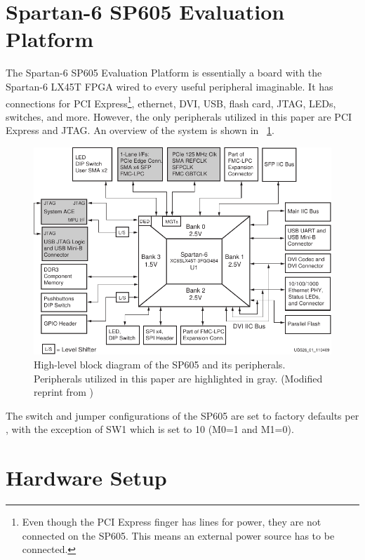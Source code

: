 \TODO

\section{Spartan-6 SP605 Evaluation Platform}

The Spartan-6 SP605 Evaluation Platform is essentially a board with the Spartan-6 LX45T FPGA wired to every useful peripheral imaginable.
It has connections for PCI Express\footnote{
        Even though the PCI Express finger has lines for power, they are not connected on the SP605. This means an external power source has to be connected.
    }, ethernet, DVI, USB, flash card, JTAG, LEDs, switches, and more.
However, the only peripherals utilized in this paper are PCI Express and JTAG.
An overview of the system is shown in \figurename~\ref{fig:sp605}.

\begin{figure}[!ht]
    \centering
    \includegraphics[width=\textwidth]{figures/sp605-modified}
    \caption[SP605]{
        High-level block diagram of the SP605 and its peripherals.
        Peripherals utilized in this paper are highlighted in gray.
        (Modified reprint from \cite{ug526})
    }
    \label{fig:sp605}
\end{figure}

The switch and jumper configurations of the SP605 are set to factory defaults per \cite{ug526}, with the exception of SW1 which is set to 10 (M0=1 and M1=0).

\section{Hardware Setup}

